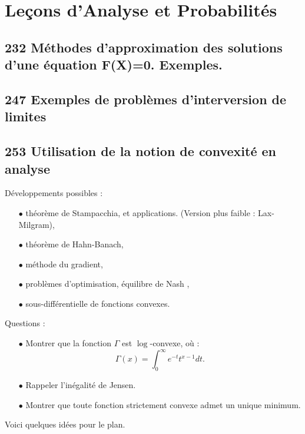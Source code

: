 \section{Leçons d'Analyse et Probabilités}

\subsection{232 Méthodes d'approximation des solutions d'une équation F(X)=0. Exemples.}
\subsection{247 Exemples de problèmes d'interversion de limites}

\subsection{253 Utilisation de la notion de convexité en analyse}

Développements possibles :\\
\begin{itemize}
\item[$\bullet$] théorème de Stampacchia, et applications. (Version plus faible : Lax-Milgram),
\item[$\bullet$] théorème de Hahn-Banach,
\item[$\bullet$] méthode du gradient,
\item[$\bullet$] problèmes d'optimisation, équilibre de Nash \cite{Testard},
\item[$\bullet$] sous-différentielle de fonctions convexes.\\
\end{itemize}

Questions :\\
\begin{itemize}
\item[$\bullet$] Montrer que la fonction $\Gamma$ est $\log$-convexe, où : \[\Gamma(x)=\int_0^\infty e^{-t}t^{x-1}dt.\]
\item[$\bullet$] Rappeler l'inégalité de Jensen.
\item[$\bullet$] Montrer que toute fonction strictement convexe admet un unique minimum.\\
\end{itemize}

Voici quelques idées pour le plan.\\

